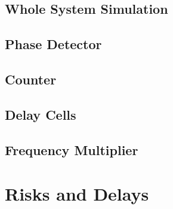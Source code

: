 \documentclass[a4paper,12pt]{article} \usepackage{graphicx}
\begin{document}
\subsection{Whole System Simulation}
\subsection{Phase Detector}
\subsection{Counter}
\subsection{Delay Cells}
\subsection{Frequency Multiplier}

\section{Risks and Delays}
\end{document}
